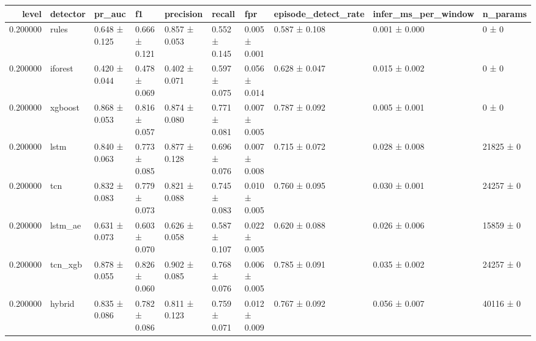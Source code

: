 \begin{tabular}{rlllllllll}
\toprule
level & detector & pr\_auc & f1 & precision & recall & fpr & episode\_detect\_rate & infer\_ms\_per\_window & n\_params \\
\midrule
0.200000 & rules & 0.648 ± 0.125 & 0.666 ± 0.121 & 0.857 ± 0.053 & 0.552 ± 0.145 & 0.005 ± 0.001 & 0.587 ± 0.108 & 0.001 ± 0.000 & 0 ± 0 \\
0.200000 & iforest & 0.420 ± 0.044 & 0.478 ± 0.069 & 0.402 ± 0.071 & 0.597 ± 0.075 & 0.056 ± 0.014 & 0.628 ± 0.047 & 0.015 ± 0.002 & 0 ± 0 \\
0.200000 & xgboost & 0.868 ± 0.053 & 0.816 ± 0.057 & 0.874 ± 0.080 & 0.771 ± 0.081 & 0.007 ± 0.005 & 0.787 ± 0.092 & 0.005 ± 0.001 & 0 ± 0 \\
0.200000 & lstm & 0.840 ± 0.063 & 0.773 ± 0.085 & 0.877 ± 0.128 & 0.696 ± 0.076 & 0.007 ± 0.008 & 0.715 ± 0.072 & 0.028 ± 0.008 & 21825 ± 0 \\
0.200000 & tcn & 0.832 ± 0.083 & 0.779 ± 0.073 & 0.821 ± 0.088 & 0.745 ± 0.083 & 0.010 ± 0.005 & 0.760 ± 0.095 & 0.030 ± 0.001 & 24257 ± 0 \\
0.200000 & lstm\_ae & 0.631 ± 0.073 & 0.603 ± 0.070 & 0.626 ± 0.058 & 0.587 ± 0.107 & 0.022 ± 0.005 & 0.620 ± 0.088 & 0.026 ± 0.006 & 15859 ± 0 \\
0.200000 & tcn\_xgb & 0.878 ± 0.055 & 0.826 ± 0.060 & 0.902 ± 0.085 & 0.768 ± 0.076 & 0.006 ± 0.005 & 0.785 ± 0.091 & 0.035 ± 0.002 & 24257 ± 0 \\
0.200000 & hybrid & 0.835 ± 0.086 & 0.782 ± 0.086 & 0.811 ± 0.123 & 0.759 ± 0.071 & 0.012 ± 0.009 & 0.767 ± 0.092 & 0.056 ± 0.007 & 40116 ± 0 \\
\bottomrule
\end{tabular}
